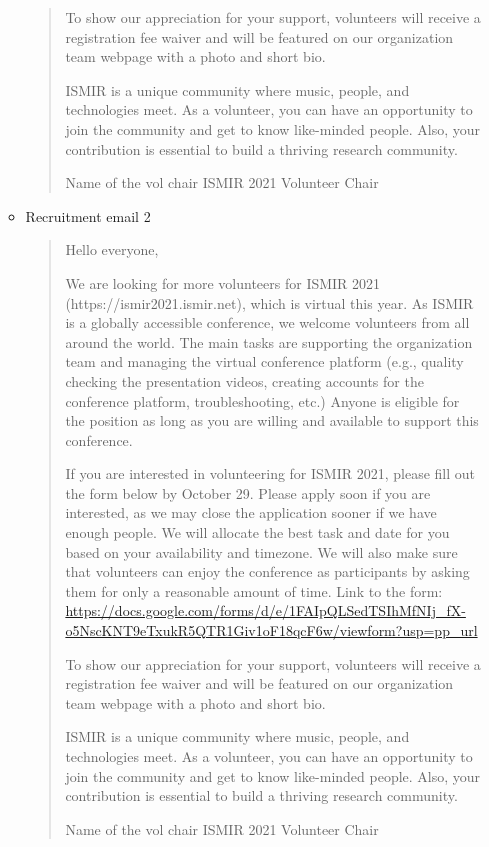 \documentclass[%
10pt,								%
]
{scrartcl}
\begin{document}
\begin{itemize}
\begin{itemize}
\begin{quote}
To show our appreciation for your support, volunteers will receive a registration fee waiver and will be featured on our organization team webpage with a photo and short bio. 

ISMIR is a unique community where music, people, and technologies meet. As a volunteer, you can have an opportunity to join the community and get to know like-minded people. Also, your contribution is essential to build a thriving research community.  

Name of the vol chair
ISMIR 2021 Volunteer Chair

                        \end{quote}
                    \item Recruitment email  2
                        \begin{quote}
                            Hello everyone, 

We are looking for more volunteers for ISMIR 2021 (https://ismir2021.ismir.net), which is virtual this year. As ISMIR is a globally accessible conference, we welcome volunteers from all around the world. The main tasks are supporting the organization team and managing the virtual conference platform (e.g., quality checking the presentation videos, creating accounts for the conference platform, troubleshooting, etc.) Anyone is eligible for the position as long as you are willing and available to support this conference.

If you are interested in volunteering for ISMIR 2021, please fill out the form below by October 29. Please apply soon if you are interested, as we may close the application sooner if we have enough people. We will allocate the best task and date for you based on your availability and timezone. We will also make sure that volunteers can enjoy the conference as participants by asking them for only a reasonable amount of time. 
Link to the form: 
\href{https://docs.google.com/forms/d/e/1FAIpQLSedTSIhMfNIj_fX-o5NscKNT9eTxukR5QTR1Giv1oF18qcF6w/viewform?usp=pp_url}{https://docs.google.com/forms/d/e/1FAIpQLSedTSIhMfNIj\_fX-o5NscKNT9eTxukR5QTR1Giv1oF18qcF6w/viewform?usp=pp\_url}

To show our appreciation for your support, volunteers will receive a registration fee waiver and will be featured on our organization team webpage with a photo and short bio. 

ISMIR is a unique community where music, people, and technologies meet. As a volunteer, you can have an opportunity to join the community and get to know like-minded people. Also, your contribution is essential to build a thriving research community.  

Name of the vol chair
ISMIR 2021 Volunteer Chair

                        \end{quote}
                \end{itemize}
        \end{itemize}
        
\end{document}
